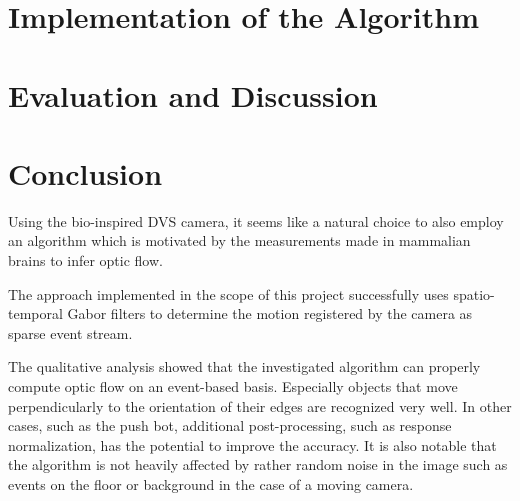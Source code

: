 \documentclass[a4paper,twoside, openright,12pt]{report}
\begin{document}





\newpage
\chapter{Implementation of the Algorithm}





\chapter{Evaluation and Discussion}





\chapter{Conclusion}


Using the bio-inspired DVS camera, it seems like a natural choice to also employ an algorithm which is motivated by the measurements made in mammalian brains to infer optic flow.

The approach implemented in the scope of this project successfully uses spatio-temporal Gabor filters to determine the motion registered by the camera as sparse event stream.

The qualitative analysis showed that the investigated algorithm can properly compute optic flow on an event-based basis.
Especially objects that move perpendicularly to the orientation of their edges are recognized very well.
In other cases, such as the push bot, additional post-processing, such as response normalization, has the potential to improve the accuracy.
It is also notable that the algorithm is not heavily affected by rather random noise in the image such as events on the floor or background in the case of a moving camera.
\end{document}
